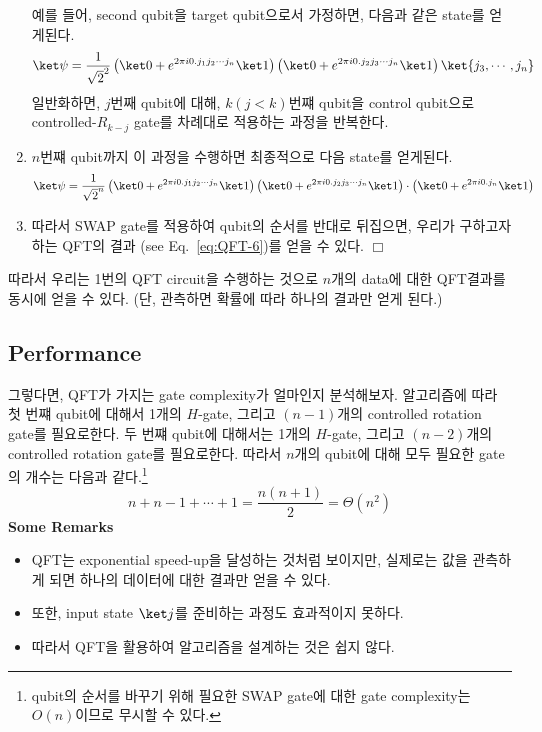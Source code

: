 \begin{enumerate}
  예를 들어, second qubit을 target qubit으로서 가정하면, 다음과 같은 state를 얻게된다.
  \begin{equation*}
    \ket \psi = \frac{1}{\sqrt 2^2} \left( \ket 0 + e^{2\pi i 0.j_1j_2 \cdots j_n} \ket 1 \right) \left( \ket 0 + e^{2\pi i 0.j_2j_3 \cdots j_n} \ket 1 \right) \ket{j_3, \cdots, j_n} 
  \end{equation*}
  일반화하면, $j$번째 qubit에 대해, $k(j < k)$번쨰 qubit을 control qubit으로 controlled-$R_{k-j}$ gate를 차례대로 적용하는 과정을 반복한다. 
  \item $n$번쨰 qubit까지 이 과정을 수행하면 최종적으로 다음 state를 얻게된다.
  \begin{equation*}
    \ket \psi = \frac{1}{\sqrt 2^n} \left( \ket 0 + e^{2\pi i 0.j_1j_2 \cdots j_n} \ket 1 \right) \left( \ket 0 + e^{2\pi i 0.j_2j_3 \cdots j_n} \ket 1 \right) \cdot \left( \ket 0 + e^{2\pi i 0.j_n} \ket 1 \right) 
  \end{equation*}
  \item 따라서 SWAP gate를 적용하여 qubit의 순서를 반대로 뒤집으면, 우리가 구하고자하는 QFT의 결과 (see Eq.~\eqref{eq:QFT-6})를 얻을 수 있다. $\Box$
\end{enumerate}

따라서 우리는 1번의 QFT circuit을 수행하는 것으로 $n$개의 data에 대한 QFT결과를 동시에 얻을 수 있다. (단, 관측하면 확률에 따라 하나의 결과만 얻게 된다.)

\subsection{Performance}
그렇다면, QFT가 가지는 gate complexity가 얼마인지 분석해보자.
알고리즘에 따라 첫 번쨰 qubit에 대해서 1개의 $H$-gate, 그리고 $(n-1)$개의 controlled rotation gate를 필요로한다. 두 번쨰 qubit에 대해서는 1개의 $H$-gate, 그리고 $(n-2)$개의 controlled rotation gate를 필요로한다. 
따라서 $n$개의 qubit에 대해 모두 필요한 gate의 개수는 다음과 같다.\footnote{qubit의 순서를 바꾸기 위해 필요한 SWAP gate에 대한 gate complexity는 $O(n)$이므로 무시할 수 있다.}
\begin{equation*}
  n + n-1 + \cdots + 1 = \frac{n(n+1)}{2} = \Theta(n^2)
\end{equation*}
\textbf{Some Remarks}
\begin{itemize}
  \item QFT는 exponential speed-up을 달성하는 것처럼 보이지만, 실제로는 값을 관측하게 되면 하나의 데이터에 대한 결과만 얻을 수 있다.
  \item 또한, input state $\ket j$를 준비하는 과정도 효과적이지 못하다.
  \item 따라서 QFT을 활용하여 알고리즘을 설계하는 것은 쉽지 않다.
\end{itemize}

